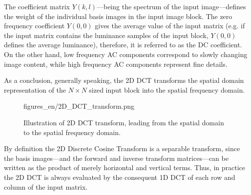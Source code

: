 The coefficient matrix $Y(k,l)$---being the spectrum of the input image---defines the weight of the individual basis images in the input image block.
The zero frequency coefficient $Y(0,0)$ gives the average value of the input matrix (e.g. if the input matrix contains the luminance samples of the input block, $Y(0,0)$ defines the average luminance), therefore, it is referred to as the DC coefficient.
On the other hand, low frequency AC components correspond to slowly changing image content, while high frequency AC components represent fine details.

As a conclusion, generally speaking, the 2D DCT transforms the spatial domain representation of the $N\times N$ sized input block into the spatial frequency domain. 
\begin{figure}[h!]
	\centering
	\begin{overpic}[width = 1\columnwidth ]{figures_en/2D_DCT_transform.png}
	\end{overpic}
	\caption{Illustration of 2D DCT transform, leading from the spatial domain to the spatial frequency domain.}
	\label{Fig:2d_dct}
\end{figure}

\vspace{3mm}
By definition the 2D Discrete Cosine Transform is a separable transform, since the basis images---and the forward and inverse transform matrices---can be written as the product of merely horizontal and vertical terms.
Thus, in practice the 2D DCT is always evaluated by the consequent 1D DCT of each row and column of the input matrix.


